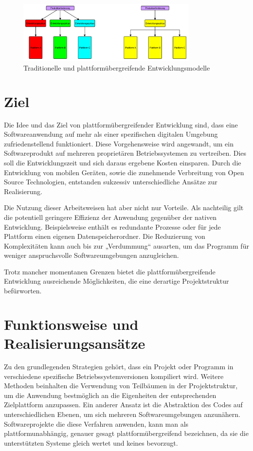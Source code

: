 \begin{figure}[htbp]
	\centering
	\includegraphics[width=0.8\textwidth]{Bilder/nativ_vs_cross}
	\caption{Traditionelle und plattformübergreifende Entwicklungsmodelle}\label{graph_nativ_vs_cross}
\end{figure}


\section{Ziel}
Die Idee und das Ziel von plattformübergreifender Entwicklung sind, dass eine Softwareanwendung auf mehr als einer spezifischen digitalen Umgebung zufriedenstellend funktioniert. Diese Vorgehensweise wird angewandt, um ein Softwareprodukt auf mehreren proprietären Betriebssystemen zu vertreiben. Dies soll die Entwicklungszeit und sich daraus ergebene Kosten einsparen. Durch die Entwicklung von mobilen Geräten, sowie die zunehmende Verbreitung von Open Source Technologien, entstanden sukzessiv unterschiedliche Ansätze zur Realisierung.

Die Nutzung dieser Arbeitsweisen hat aber nicht nur Vorteile. Als nachteilig gilt die potentiell geringere Effizienz der Anwendung gegenüber der nativen Entwicklung. Beispielsweise enthält es redundante Prozesse oder für jede Plattform einen eigenen Datenspeicherordner. Die Reduzierung von Komplexitäten kann auch bis zur „Verdummung“ ausarten, um das Programm für weniger anspruchsvolle Softwareumgebungen anzugleichen. 

Trotz mancher momentanen Grenzen bietet die plattformübergreifende Entwicklung ausreichende Möglichkeiten, die eine derartige Projektstruktur befürworten.\citep{cross_plattform_explanation}

\section{Funktionsweise und Realisierungsansätze}
Zu den grundlegenden Strategien gehört, dass ein Projekt oder Programm in verschiedene spezifische Betriebssystemversionen kompiliert wird. Weitere Methoden beinhalten die Verwendung von Teilbäumen in der Projektstruktur, um die Anwendung bestmöglich an die Eigenheiten der entsprechenden Zielplattform anzupassen. Ein anderer Ansatz ist die Abstraktion des Codes auf unterschiedlichen Ebenen, um sich mehreren Softwareumgebungen anzunähern. Softwareprojekte die diese Verfahren anwenden, kann man als plattformunabhängig, genauer gesagt plattformübergreifend bezeichnen, da sie die unterstützten Systeme gleich wertet und keines bevorzugt.\citep{cross_plattform_explanation}

